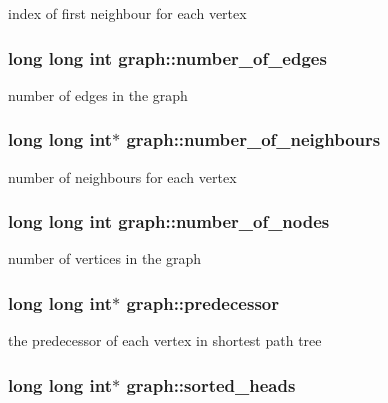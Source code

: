 index of first neighbour for each vertex \hypertarget{structgraph_ac0108c6c9e85e0b713e90dd56ae9baaf}{
\subsubsection[{number\+\_\+of\+\_\+edges}]{\setlength{\rightskip}{0pt plus 5cm}long long int graph\+::number\+\_\+of\+\_\+edges}}\label{structgraph_ac0108c6c9e85e0b713e90dd56ae9baaf}
number of edges in the graph \hypertarget{structgraph_a4c22b3b81cf0963d8f0fbbe2b1318b67}{
\subsubsection[{number\+\_\+of\+\_\+neighbours}]{\setlength{\rightskip}{0pt plus 5cm}long long int$\ast$ graph\+::number\+\_\+of\+\_\+neighbours}}\label{structgraph_a4c22b3b81cf0963d8f0fbbe2b1318b67}
number of neighbours for each vertex \hypertarget{structgraph_a4aea87ae37b169f48f70435db134d4fd}{
\subsubsection[{number\+\_\+of\+\_\+nodes}]{\setlength{\rightskip}{0pt plus 5cm}long long int graph\+::number\+\_\+of\+\_\+nodes}}\label{structgraph_a4aea87ae37b169f48f70435db134d4fd}
number of vertices in the graph \hypertarget{structgraph_a6b2829d391e7300b3c9011e4beb6a26f}{
\subsubsection[{predecessor}]{\setlength{\rightskip}{0pt plus 5cm}long long int$\ast$ graph\+::predecessor}}\label{structgraph_a6b2829d391e7300b3c9011e4beb6a26f}
the predecessor of each vertex in shortest path tree \hypertarget{structgraph_a5fa53cf09974589747fa15651cd4debb}{
\subsubsection[{sorted\+\_\+heads}]{\setlength{\rightskip}{0pt plus 5cm}long long int$\ast$ graph\+::sorted\+\_\+heads}}\label{structgraph_a5fa53cf09974589747fa15651cd4debb}
